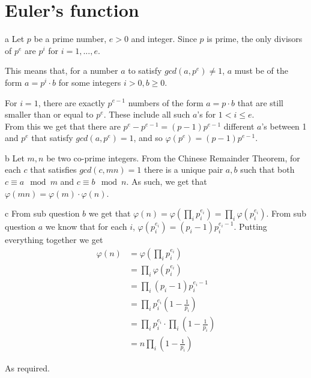 \documentclass{article}
\begin{document}
\section{Euler's function}
\begin{paragraph}
    a Let \(p\) be a prime number, \(e > 0\) and integer. Since \(p\) is prime, the only divisors of \(p^e\) are \(p^i\) for \(i = 1, ..., e\).
    
    This means that, for a number \(a\) to satisfy \(gcd(a, p^e) \neq 1\), \(a\) must be of the form \(a = p^i \cdot b\) for some integers \(i > 0, b \geq 0\).
    
    For \(i = 1\), there are exactly \(p^{e - 1}\) numbers of the form \(a = p \cdot b\) that are still smaller than or equal to \(p^e\). These include all such \(a\)'s for \(1 < i \leq e\).\\
    
    From this we get that there are \(p^e - p^{e - 1} = (p - 1) p^{e - 1}\) different \(a\)'s between 1 and \(p^e\) that satisfy \(gcd(a, p^e) = 1\), and so \(\varphi(p^e) = (p - 1) p^{e - 1}\).
\end{paragraph}

\begin{paragraph}
    b Let \(m, n\) be two co-prime integers. From the Chinese Remainder Theorem, for each \(c\) that satisfies \(gcd(c, mn) = 1\) there is a unique pair \(a, b\) such that both \(c \equiv a \mod{m}\) and \(c \equiv b \mod{n}\). As such, we get that \(\varphi(mn) = \varphi(m) \cdot \varphi(n)\). \iffalse Can you go over this? \fi
\end{paragraph}

\begin{paragraph}
    c From sub question \(b\) we get that \(\varphi(n) = \varphi(\prod\limits_i p_i^{e_i}) = \prod\limits_i \varphi(p_i^{e_i})\). From sub question \(a\) we know that for each \(i\), \(\varphi(p_i^{e_i}) = (p_i - 1) p_i^{e_i - 1}\). Putting everything together we get
    \begin{align*}
        \varphi(n) &= \varphi(\prod\limits_i p_i^{e_i})\\
        &= \prod\limits_i \varphi(p_i^{e_i})\\
        &= \prod\limits_i (p_i - 1) p_i^{e_i - 1}\\
        &= \prod\limits_i p_i^{e_i} (1 - \frac{1}{p_i})\\
        &= \prod\limits_i p_i^{e_i} \cdot \prod\limits_i (1 - \frac{1}{p_i})\\
        &= n \prod\limits_i (1 - \frac{1}{p_i})
    \end{align*}
    
    As required.
\end{paragraph}
\newpage
\end{document}
